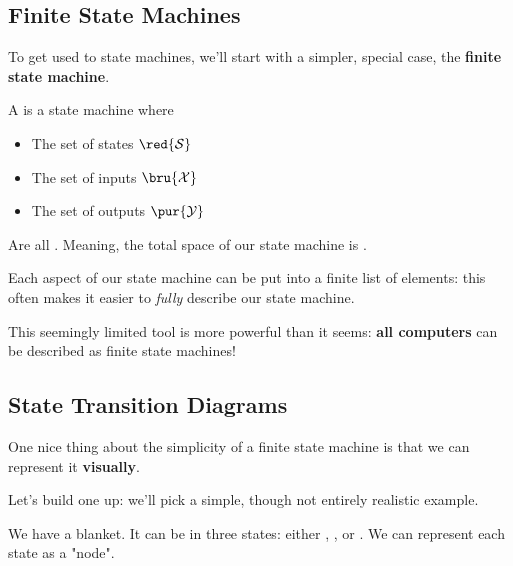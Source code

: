     \subsection{Finite State Machines}

        To get used to state machines, we'll start with a simpler, special case, the \textbf{finite state machine}.\\
            
        \begin{definition}
            A  is a state machine where
            
            \begin{itemize}
                \item The set of states $\red{\mathcal{S}}$
                \item The set of inputs $\bru{\mathcal{X}}$
                \item The set of outputs $\pur{\mathcal{Y}}$
            \end{itemize}
            
            Are all . Meaning, the total space of our state machine is .
            
            Each aspect of our state machine can be put into a finite list of elements: this often makes it easier to \textit{fully} describe our state machine.
        \end{definition}
        
        This seemingly limited tool is more powerful than it seems: \textbf{all computers} can be described as finite state machines!




    \phantom{}

    \subsection{State Transition Diagrams}

        One nice thing about the simplicity of a finite state machine is that we can represent it \textbf{visually}.
            
        Let's build one up: we'll pick a simple, though not entirely realistic example.
        
        \miniex We have a blanket. It can be in three states: either , , or . We can represent each state as a "node".
        
